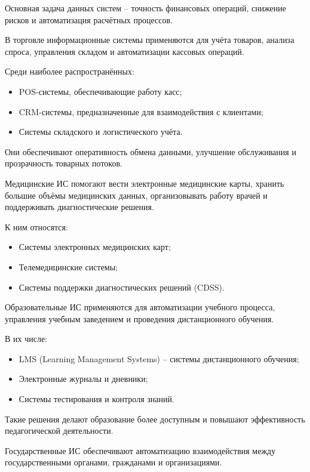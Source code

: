 \documentclass{ou}
\begin{document}
Основная задача данных систем -- точность финансовых операций, снижение рисков и автоматизация расчётных процессов.

В торговле информационные системы применяются для учёта товаров, анализа спроса, управления складом и автоматизации кассовых операций.

Среди наиболее распространённых:
\begin{itemize}[label=-, itemindent=4em, nosep]
\item POS-системы, обеспечивающие работу касс;
\item CRM-системы, предназначенные для взаимодействия с клиентами;
\item Системы складского и логистического учёта.
\end{itemize}

Они обеспечивают оперативность обмена данными, улучшение обслуживания и прозрачность товарных потоков.

Медицинские ИС помогают вести электронные медицинские карты, хранить большие объёмы медицинских данных, организовывать работу врачей и поддерживать диагностические решения.

К ним относятся:
\begin{itemize}[label=-, itemindent=4em, nosep]
\item Системы электронных медицинских карт;
\item Телемедицинские системы;
\item Системы поддержки диагностических решений (CDSS).
\end{itemize}

Образовательные ИС применяются для автоматизации учебного процесса, управления учебным заведением и проведения дистанционного обучения.

В их числе:
\begin{itemize}[label=-, itemindent=4em, nosep]
\item LMS (Learning Management Systems) -- системы дистанционного обучения;
\item Электронные журналы и дневники;
\item Системы тестирования и контроля знаний.
\end{itemize}

Такие решения делают образование более доступным и повышают эффективность педагогической деятельности.

Государственные ИС обеспечивают автоматизацию взаимодействия между государственными органами, гражданами и организациями.
\end{document}
